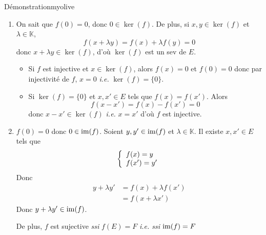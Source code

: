     \begin{demo}{Démonstration}{myolive}
        \begin{enumerate}
            \item On sait que $f(0) = 0$, donc $0 \in \ker(f)$. De plus, si $x,y \in \ker(f)$ et $\lambda \in \mathbb{K}$, 
            \[ f(x+\lambda y) = f(x) + \lambda f(y) = 0 \]   
            donc $x + \lambda y \in \ker(f)$, d’où $\ker(f)$ est un sev de $E$.

            \begin{itemize}
                \item Si $f$ est injective et $x \in \ker(f)$, alors $f(x) = 0$ et $f(0) = 0$ donc par injectivité de $f$, $x = 0$ \textit{i.e.} $\ker(f) = \{0\}$.
                \item Si $\ker(f) = \{0\}$ et $x,x' \in E$ tels que $f(x) = f(x')$. Alors 
                \[ f(x - x') = f(x) - f(x') = 0 \]   
                donc $x - x' \in \ker(f)$ \textit{i.e.} $x = x'$ d’où $f$ est injective.
            \end{itemize}
            \item $f(0) = 0$ donc $0 \in \operatorname{im}(f)$. Soient $y,y' \in \operatorname{im}(f)$ et $\lambda \in \mathbb{K}$. Il existe $x, x' \in E$ tels que 
            \[ \et{f(x) = y}{f(x') = y'} \]
            Donc 
            \begin{align*}
                y + \lambda y' 
                &= f(x) + \lambda f(x') \\
                &= f(x + \lambda x')
            \end{align*}
            Donc $y + \lambda y' \in \operatorname{im}(f)$.

            De plus, $f$ est sujective \textit{ssi} $f(E) = F$ \textit{i.e. ssi} $\operatorname{im}(f) = F$
        \end{enumerate}
    \end{demo}

